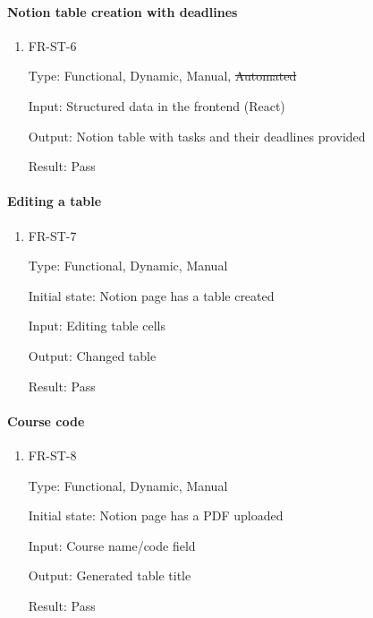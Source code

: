 \documentclass[12pt, titlepage]{article}
\begin{document}
\paragraph{Notion table creation with deadlines}

\begin{enumerate}

\item{FR-ST-6\\}

Type: Functional, Dynamic, Manual, \sout{Automated} 

Input: Structured data in the frontend (React) 

Output: Notion table with tasks and their deadlines provided 

Result: Pass

\end{enumerate}

\paragraph{Editing a table}

\begin{enumerate}

\item{FR-ST-7\\}

Type: Functional, Dynamic, Manual 

Initial state: Notion page has a table created 

Input: Editing table cells 

Output: Changed table 

Result: Pass

\end{enumerate}

\paragraph{Course code}

\begin{enumerate}

\item{FR-ST-8\\}

Type: Functional, Dynamic, Manual 

Initial state: Notion page has a PDF uploaded 

Input: Course name/code field 

Output: Generated table title  

Result: Pass

\end{enumerate}
\end{document}
